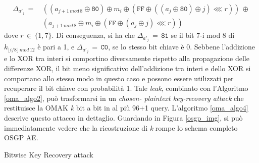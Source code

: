 \begin{equation*}
\begin{split}
\Delta_{a'_j} \, = \, & ((a_{j+1 \, mod \, 8} \oplus \texttt{80}) \oplus m_i \oplus (\texttt{FF} \oplus ((a_j \oplus \texttt{80}) \oplus j) \lll r)) \, \oplus \\
&(a_{j+1 \, mod \, 8} \oplus m_i \oplus (\texttt{FF} \oplus (a_j \oplus j) \lll r))
\end{split}
\end{equation*}
dove $r\,\in \, \{1,7\}$. Di conseguenza, si ha che $\Delta_{a'_j}\,=\,\texttt{81}$ se il bit 7-i mod 8 di $k_{\lfloor i/8 \rfloor \, mod \, 12}$ è pari a 1, e $\Delta_{a'_j}\,=\,\texttt{C0}$, se lo stesso bit chiave è 0. Sebbene l'addizione e lo XOR tra interi si comportino diversamente rispetto alla propagazione delle differenze XOR, il bit meno significativo dell'addizione tra interi e dello XOR si comportano allo stesso modo in questo caso e possono essere utilizzati per recuperare il bit chiave con probabilità 1. \newline
Tale \textit{leak}, combinato con l'Algoritmo \ref{oma_algo2}, può trasformarsi in un \textit{chosen- plaintext key-recovery attack} che restituisce la OMAK \textit{k} bit a bit in al più 96+1 query. L'algoritmo \ref{oma_algo4} descrive questo attacco in dettaglio. Guardando in Figura \ref{osgp_img}, si può immediatamente vedere che la ricostruzione di \textit{k} rompe lo schema completo OSGP AE.
\begin{algorithm}[h]
\caption{Bitwise Key Recovery attack}
\label{oma_algo4}
\end{algorithm}
\newpage
